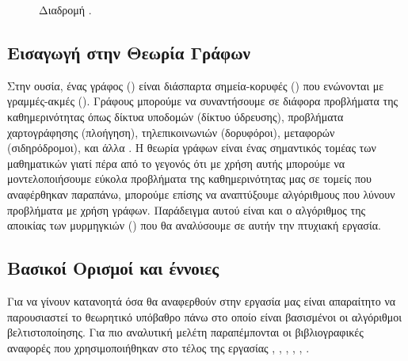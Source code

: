 \begin{figure}[ht]
\begin{minipage}[c]{.46\linewidth}
        \caption{Διαδρομή .}
        \label{4}
    \end{minipage}
\end{figure} 


\subsection{Εισαγωγή στην Θεωρία Γράφων}

Στην ουσία, ένας γράφος () είναι διάσπαρτα σημεία-κορυφές () που ενώνονται με γραμμές-ακμές (). Γράφους μπορούμε να συναντήσουμε σε διάφορα προβλήματα της καθημερινότητας όπως δίκτυα υποδομών (δίκτυο ύδρευσης), προβλήματα χαρτογράφησης (πλοήγηση), τηλεπικοινωνιών (δορυφόροι), μεταφορών (σιδηρόδρομοι), και άλλα \cite{manwlopoulos2014thewria}. Η θεωρία γράφων είναι ένας σημαντικός τομέας των μαθηματικών γιατί πέρα από το γεγονός ότι με χρήση αυτής μπορούμε να μοντελοποιήσουμε εύκολα προβλήματα της καθημερινότητας μας σε τομείς που αναφέρθηκαν παραπάνω, μπορούμε επίσης να αναπτύξουμε αλγόριθμους που λύνουν προβλήματα με χρήση γράφων. Παράδειγμα αυτού είναι και ο αλγόριθμος της αποικίας των μυρμηγκιών () που θα αναλύσουμε σε αυτήν την πτυχιακή εργασία.

\subsection{Βασικοί Ορισμοί και έννοιες}
Για να γίνουν κατανοητά όσα θα αναφερθούν στην εργασία μας είναι απαραίτητο να παρουσιαστεί το θεωρητικό υπόβαθρο πάνω στο οποίο είναι βασισμένοι οι αλγόριθμοι βελτιστοποίησης. Για πιο αναλυτική μελέτη παραπέμπονται οι βιβλιογραφικές αναφορές που χρησιμοποιήθηκαν στο τέλος της εργασίας \cite{bondy1976usr}, \cite{perez2020introduction}, \cite{Gewrgiadis2017thewria}, \cite{gkertsis2023thewria}, \cite{mavrovouniotis2014ant}, \cite{ntenisiwtis2023thewria}.

